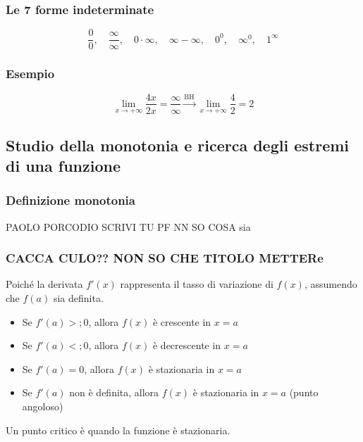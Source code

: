 \documentclass{article}
\begin{document}
\subsubsection{Le 7 forme indeterminate}
\begin{center}
    \[
        \frac{0}{0}, \quad
        \frac{\infty}{\infty}, \quad
        0 \cdot \infty, \quad
        \infty - \infty, \quad
        0^0, \quad
        \infty^0, \quad
        1^\infty
    \]
\end{center}

\subsubsection{Esempio}
\begin{equation*}
    \lim_{x \to +\infty} \frac{4x}{2x} = \frac{\infty}{\infty}
    \overset{\text{BH}}{\longrightarrow} \lim_{x \to +\infty} \frac{4}{2} = 2
\end{equation*}

\newpage
\subsection{Studio della monotonia e ricerca degli estremi di una funzione}
\subsubsection{Definizione monotonia}
PAOLO PORCODIO SCRIVI TU PF NN SO COSA sia

\subsubsection{CACCA CULO?? NON SO CHE TITOLO METTERe}
Poiché la derivata \(f'(x)\) rappresenta il tasso di variazione di \(f(x)\), assumendo che
\(f(a)\) sia definita.

\begin{itemize}
    \item Se \(f'(a) >; 0\), allora \(f(x)\) è crescente in \(x = a\)
    \item Se \(f'(a) <; 0\), allora \(f(x)\) è decrescente in \(x = a\)
    \item Se \(f'(a) = 0\), allora \(f(x)\) è stazionaria in \(x = a\)
    \item Se \(f'(a)\) non è definita, allora \(f(x)\) è stazionaria in \(x = a\)
    (punto angoloso)
\end{itemize}

Un punto critico è quando la funzione è stazionaria.
\end{document}
